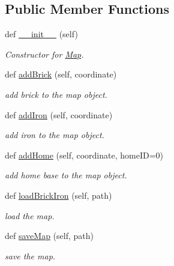 \subsection*{Public Member Functions}
\begin{DoxyCompactItemize}
\item 
def \mbox{\hyperlink{class_map_1_1_map_a16b297030b6f61b2601cd40d2e5b5e0d}{\+\_\+\+\_\+init\+\_\+\+\_\+}} (self)
\begin{DoxyCompactList}\small\item\em Constructor for \mbox{\hyperlink{class_map_1_1_map}{Map}}. \end{DoxyCompactList}\item 
def \mbox{\hyperlink{class_map_1_1_map_aff66398f6c8d1a6bcb27737cbfc6f7a5}{add\+Brick}} (self, coordinate)
\begin{DoxyCompactList}\small\item\em add brick to the map object. \end{DoxyCompactList}\item 
def \mbox{\hyperlink{class_map_1_1_map_a39480d6d0752ceb6395862074222b3b4}{add\+Iron}} (self, coordinate)
\begin{DoxyCompactList}\small\item\em add iron to the map object. \end{DoxyCompactList}\item 
def \mbox{\hyperlink{class_map_1_1_map_a70217ab9229c2a28f042dae7df33874b}{add\+Home}} (self, coordinate, home\+ID=0)
\begin{DoxyCompactList}\small\item\em add home base to the map object. \end{DoxyCompactList}\item 
def \mbox{\hyperlink{class_map_1_1_map_a2338f8ecffd7308bb8fbaa2fb76b4e45}{load\+Brick\+Iron}} (self, path)
\begin{DoxyCompactList}\small\item\em load the map. \end{DoxyCompactList}\item 
def \mbox{\hyperlink{class_map_1_1_map_a6ea2d6c6c1d7b6db6641c1ef00f59e85}{save\+Map}} (self, path)
\begin{DoxyCompactList}\small\item\em save the map. \end{DoxyCompactList}\end{DoxyCompactItemize}
